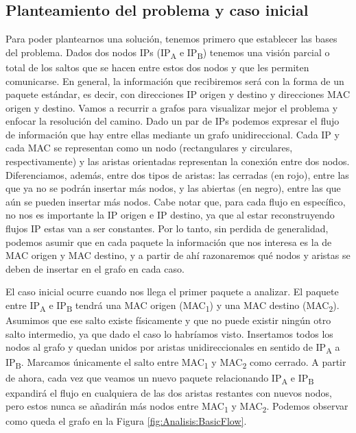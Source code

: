\documentclass[tfg,epsbased,lof,lot,loa,final,nocopyright,overleaf]{tfgtfmthesisuam}
\begin{document}
\subsection{Planteamiento del problema y caso inicial}
Para poder plantearnos una solución, tenemos primero que establecer las bases del problema. Dados dos nodos IPs (IP\textsubscript{A} e IP\textsubscript{B}) tenemos una visión parcial o total de los saltos que se hacen entre estos dos nodos y que les permiten comunicarse. En general, la información que recibiremos será con la forma de un paquete estándar, es decir, con direcciones IP origen y destino y direcciones MAC origen y destino. Vamos a recurrir a grafos para visualizar mejor el problema y enfocar la resolución del camino. Dado un par de IPs podemos expresar el flujo de información que hay entre ellas mediante un grafo unidireccional. Cada IP y cada MAC se representan como un nodo (rectangulares y circulares, respectivamente) y las aristas orientadas representan la conexión entre dos nodos. Diferenciamos, además, entre dos tipos de aristas: las cerradas (en rojo), entre las que ya no se podrán insertar más nodos, y las abiertas (en negro), entre las que aún se pueden insertar más nodos. Cabe notar que, para cada flujo en específico, no nos es importante la IP origen e IP destino, ya que al estar reconstruyendo flujos IP estas van a ser constantes. Por lo tanto, sin perdida de generalidad, podemos asumir que en cada paquete la información que nos interesa es la de MAC origen y MAC destino, y a partir de ahí razonaremos qué nodos y aristas se deben de insertar en el grafo en cada caso. 

El caso inicial ocurre cuando nos llega el primer paquete a analizar. El paquete entre IP\textsubscript{A} e IP\textsubscript{B} tendrá una MAC origen (MAC\textsubscript{1}) y una MAC destino (MAC\textsubscript{2}). Asumimos que ese salto existe físicamente y que no puede existir ningún otro salto intermedio, ya que dado el caso lo habríamos visto. Insertamos todos los nodos al grafo y quedan unidos por aristas unidireccionales en sentido de IP\textsubscript{A} a IP\textsubscript{B}. Marcamos únicamente el salto entre MAC\textsubscript{1} y MAC\textsubscript{2} como cerrado. A partir de ahora, cada vez que veamos un nuevo paquete relacionando IP\textsubscript{A} e IP\textsubscript{B} expandirá el flujo en cualquiera de las dos aristas restantes con nuevos nodos, pero estos nunca se añadirán más nodos entre MAC\textsubscript{1} y MAC\textsubscript{2}. Podemos observar como queda el grafo en la Figura \ref{fig:Analisis:BasicFlow}.
\end{document}
